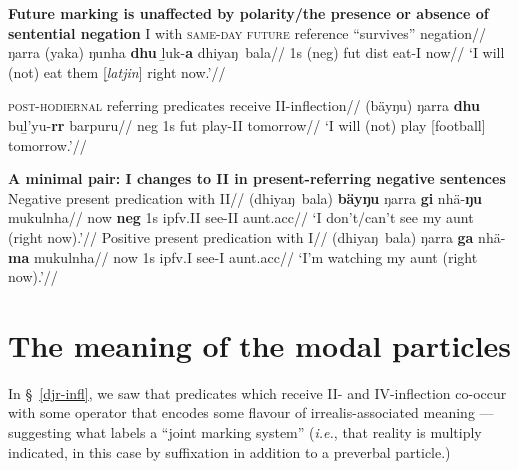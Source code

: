 \pex \textbf{Future marking is unaffected by polarity/the presence or absence of sentential negation}	
\a\begingl\glpreamble \gls{I} with \textsc{same-day future} reference ``survives'' negation//
\gla ŋarra (yaka) ŋunha \textbf{dhu} ḻuk-\textbf{a} dhiyaŋ~bala//
\glb 1s (\gls{neg}) \gls{fut} \gls{dist} eat-\gls{I} now//
\glft`I will (not) eat them [\textit{ḻatjin}] right now.'\trailingcitation{[AW~20190422]}//\endgl

\a\begingl\glpreamble \textsc{post-hodiernal} referring predicates receive \gls{II}-inflection//
\gla (bäyŋu) ŋarra \textbf{dhu} buḻ'yu-\textbf{rr} barpuru//
\glb \gls{neg} 1s \gls{fut} play-\gls{II} tomorrow//
\glft`I will (not) play [football] tomorrow.'\trailingcitation{[AW~20190429]}//\endgl
\xe

\pex \textbf{A minimal pair: \gls{I} changes to \gls{II} in present-referring negative sentences}
\a\begingl\glpreamble Negative present predication with \gls{II}//
\gla (dhiyaŋ~bala) \textbf{bäyŋu} ŋarra \textbf{gi} nhä-\textbf{ŋu} mukulnha//
\glb now \textbf{\gls{neg}} 1s \gls{ipfv}.\gls{II} see-\gls{II} aunt.\gls{acc}//
\glft`I don't/can't see my aunt (right now).'\trailingcitation{[AW~20190501]}//\endgl
\a\begingl\glpreamble Positive present predication with \gls{I}//
\gla (dhiyaŋ~bala)  ŋarra \textbf{ga} nhä-\textbf{ma} mukulnha//
\glb now 1s \gls{ipfv}.\gls{I} see-\gls{I} aunt.\gls{acc}//
\glft`I'm watching my aunt (right now).'//
\endgl\xe


\section{The meaning of the modal particles}
\label{sec:modals}
In \S~\ref{djr-infl}, we saw that predicates which receive \gls{II}- and \gls{IV}-inflection co-occur with some operator that encodes some flavour of irrealis-associated meaning --- suggesting what \citet[145]{Palmer2001} labels a ``joint marking system'' (\textit{i.e.}, that reality is multiply indicated, in this case by suffixation in addition to a preverbal particle.) 

